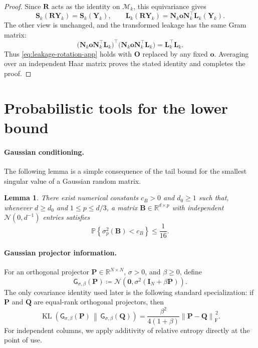 \documentclass[11pt]{article}
\newtheorem{lemma}{Lemma}
\newcommand{\R}{\mathbb{R}}
\newcommand{\trans}{\top}
\newcommand{\frn}[1]{\left\lVert #1\right\rVert_{\mathrm{F}}}
\newcommand{\cM}{\mathcal{M}}
\begin{document}
\begin{proof}
Since \(\bm R\) acts as the identity on \(\cM_k\), this equivariance gives
\[
  \bm S_k(\bm R\bm Y_k)=\bm S_k(\bm Y_k),
  \qquad
  \bm L_k(\bm R\bm Y_k)
  =
  \bm N_k\bm o\bm N_k^\trans\bm L_k(\bm Y_k).
\]
The other view is unchanged, and the transformed leakage has the same Gram
matrix:
\[
  \bigl(
    \bm N_k\bm o\bm N_k^\trans\bm L_k
  \bigr)^\trans
  \bigl(
    \bm N_k\bm o\bm N_k^\trans\bm L_k
  \bigr)
  =
  \bm L_k^\trans\bm L_k.
\]
Thus \cref{eq:leakage-rotation-app} holds with \(\bm O\) replaced by any
fixed \(\bm o\). Averaging over an independent Haar matrix proves the stated
identity and completes the proof.
\end{proof}



\section{Probabilistic tools for the lower bound}

\paragraph{Gaussian conditioning.}
The following lemma is a simple consequence of the tail bound for the smallest singular value of a Gaussian random matrix. 
\begin{lemma}
\label{lem:gaussian-loading-lower-bound}
There exist numerical constants $c_B>0$ and $d_0\ge1$ such that,
whenever $d\ge d_0$ and $1\le p\le d/3$, a matrix
$\bm B\in\mathbb R^{d\times p}$ with independent
$\mathcal N(0,d^{-1})$ entries satisfies
\[
  \mathbb P\left\{
    \sigma_p^2(\bm B)<c_B
  \right\}
  \le \frac1{16}.
\]

\end{lemma}



\paragraph{Gaussian projector information.}
For an orthogonal projector $\bm P\in\R^{N\times N}$, $\sigma>0$, and
$\beta\ge0$, define
\[
  \mathsf G_{\sigma,\beta}(\bm P)
  \coloneqq
  \mathcal N\left(\bm 0,\sigma^2(\bm I_N+\beta\bm P)\right).
\]
The only covariance identity used later is the following standard
specialization: if $\bm P$ and $\bm Q$ are equal-rank orthogonal projectors,
then
\begin{equation}
\label{eq:gaussian-projector-kl}
  \operatorname{KL}\left(
    \mathsf G_{\sigma,\beta}(\bm P)
    \,\middle\|\,
    \mathsf G_{\sigma,\beta}(\bm Q)
  \right)
  =
  \frac{\beta^2}{4(1+\beta)}
  \frn{\bm P-\bm Q}^{\,2}.
\end{equation}
For independent columns, we apply additivity of relative entropy directly at
the point of use.
\end{document}
